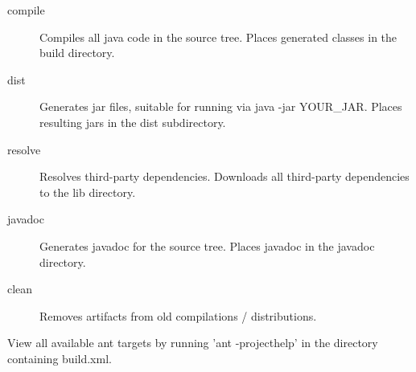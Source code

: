 \begin{description}
  \item[compile] Compiles all java code in the source tree.  Places generated classes in the build directory.
  \item[dist] Generates jar files, suitable for running via java -jar {YOUR\_JAR}.  Places resulting jars in the dist subdirectory.
  \item[resolve] Resolves third-party dependencies.  Downloads all third-party dependencies to the lib directory.
  \item[javadoc] Generates javadoc for the source tree.  Places javadoc in the javadoc directory.
  \item[clean] Removes artifacts from old compilations / distributions.
\end{description}
View all available ant targets by running 'ant -projecthelp' in the directory containing build.xml.

